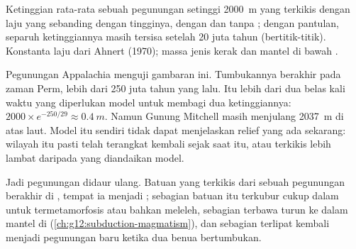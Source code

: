 \begin{omfigure}

{\small Ketinggian rata-rata sebuah pegunungan setinggi \qty{2000}{m} yang
terkikis dengan laju yang sebanding dengan tingginya, dengan dan tanpa ; dengan pantulan, separuh ketinggiannya masih tersisa setelah 20 juta
tahun (bertitik-titik). Konstanta laju dari Ahnert (1970); massa jenis kerak dan
mantel di bawah .}
\end{omfigure}

Pegunungan Appalachia menguji gambaran ini. Tumbukannya berakhir pada zaman
Perm, lebih dari 250 juta tahun yang lalu. Itu lebih dari dua belas kali waktu
yang diperlukan model untuk membagi dua ketinggiannya: $2000 \times e^{-250/29} \approx
\qty{0.4}{m}$. Namun Gunung Mitchell masih menjulang \qty{2037}{m} di atas laut.
Model itu sendiri tidak dapat menjelaskan relief yang ada sekarang: wilayah itu
pasti telah terangkat kembali sejak saat itu, atau terkikis lebih lambat
daripada yang diandaikan model.

Jadi pegunungan didaur ulang. Batuan yang terkikis dari sebuah pegunungan
berakhir di , tempat ia menjadi ; sebagian
batuan itu terkubur cukup dalam untuk termetamorfosis atau bahkan meleleh,
sebagian terbawa turun ke dalam mantel di 
(\cref{ch:g12:subduction-magmatism}), dan sebagian terlipat kembali menjadi
pegunungan baru ketika dua benua bertumbukan.

